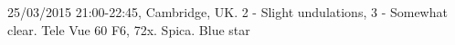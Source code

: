 \item 25/03/2015 21:00-22:45, Cambridge, UK. 2 - Slight undulations, 3 - Somewhat clear. Tele Vue 60 F6, 72x. Spica. Blue star
